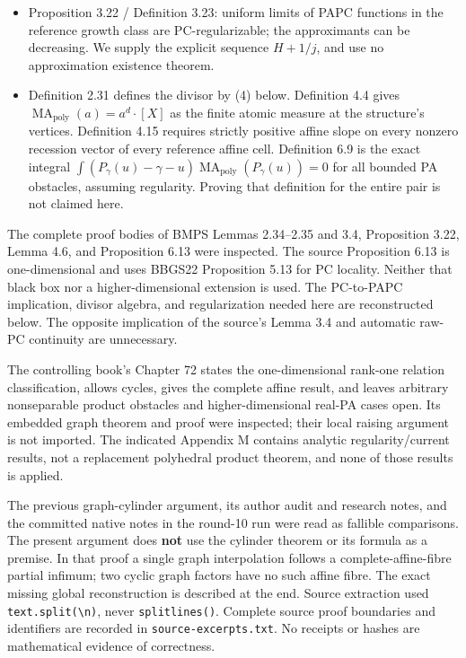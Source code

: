 \documentclass[
  10pt,
]{article}
\begin{document}
\begin{itemize}
\[  \] The competitors themselves need only the upper growth bound
  displayed in (3).
\item
  Proposition 3.22 / Definition 3.23: uniform limits of PAPC functions
  in the reference growth class are PC-regularizable; the approximants
  can be decreasing. We supply the explicit sequence \(H+1/j\), and use
  no approximation existence theorem.
\item
  Definition 2.31 defines the divisor by (4) below. Definition 4.4 gives
  \(\operatorname{MA}_{\mathrm{poly}}(a)=a^d\cdot[X]\) as the finite
  atomic measure at the structure's vertices. Definition 4.15 requires
  strictly positive affine slope on every nonzero recession vector of
  every reference affine cell. Definition 6.9 is the exact integral
  \(\int(P_\gamma(u)-\gamma-u)\operatorname{MA}_{\mathrm{poly}}(P_\gamma(u))=0\)
  for all bounded PA obstacles, assuming regularity. Proving that
  definition for the entire pair is not claimed here.
\end{itemize}

The complete proof bodies of BMPS Lemmas 2.34--2.35 and 3.4, Proposition
3.22, Lemma 4.6, and Proposition 6.13 were inspected. The source
Proposition 6.13 is one-dimensional and uses BBGS22 Proposition 5.13 for
PC locality. Neither that black box nor a higher-dimensional extension
is used. The PC-to-PAPC implication, divisor algebra, and regularization
needed here are reconstructed below. The opposite implication of the
source's Lemma 3.4 and automatic raw-PC continuity are unnecessary.

The controlling book's Chapter 72 states the one-dimensional rank-one
relation classification, allows cycles, gives the complete affine
result, and leaves arbitrary nonseparable product obstacles and
higher-dimensional real-PA cases open. Its embedded graph theorem and
proof were inspected; their local raising argument is not imported. The
indicated Appendix M contains analytic regularity/current results, not a
replacement polyhedral product theorem, and none of those results is
applied.

The previous graph-cylinder argument, its author audit and research
notes, and the committed native notes in the round-10 run were read as
fallible comparisons. The present argument does \textbf{not} use the
cylinder theorem or its formula as a premise. In that proof a single
graph interpolation follows a complete-affine-fibre partial infimum; two
cyclic graph factors have no such affine fibre. The exact missing global
reconstruction is described at the end. Source extraction used
\texttt{text.split(\textquotesingle{}\textbackslash{}n\textquotesingle{})},
never \texttt{splitlines()}. Complete source proof boundaries and
identifiers are recorded in \texttt{source-excerpts.txt}. No receipts or
hashes are mathematical evidence of correctness.
\end{document}
